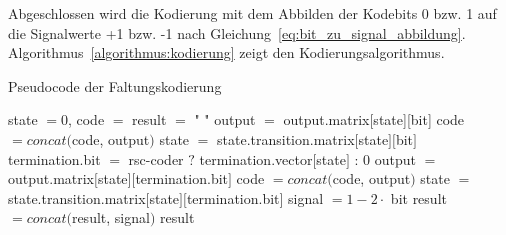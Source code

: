 Abgeschlossen wird die Kodierung mit dem Abbilden der Kodebits 0 bzw. 1 auf die Signalwerte +1 bzw. -1 nach Gleichung~\eqref{eq:bit_zu_signal_abbildung}. Algorithmus~\ref{algorithmus:kodierung} zeigt den Kodierungsalgorithmus.
\begin{algorithm}[H]
\renewcommand{\algorithmicforall}{\textbf{for each}}
\caption{Pseudocode der Faltungskodierung}
\label{algorithmus:kodierung}
\begin{algorithmic}[1]
\STATE state $=0$, code $=$ result $=$ " "
   \STATE output $=$ output.matrix[state][bit]
	\STATE code $=\mathit{concat}($code, output$)$
	\STATE state $=$ state.transition.matrix$[$state$][$bit$]$
\ENDFOR
{}
      \STATE termination.bit $=$ rsc-coder $?$ termination.vector$[$state$]$ : $0$
      \STATE output $=$ output.matrix$[$state$][$termination.bit$]$
	   \STATE code $=\mathit{concat}($code, output$)$
	   \STATE state $=$ state.transition.matrix$[$state$][$termination.bit$]$
   \ENDFOR
\ENDIF
{}
   \STATE signal $=1-2\cdot$ bit
   \STATE result $=\mathit{concat}($result, signal$)$
\ENDFOR
\RETURN result
\end{algorithmic}
\end{algorithm}

